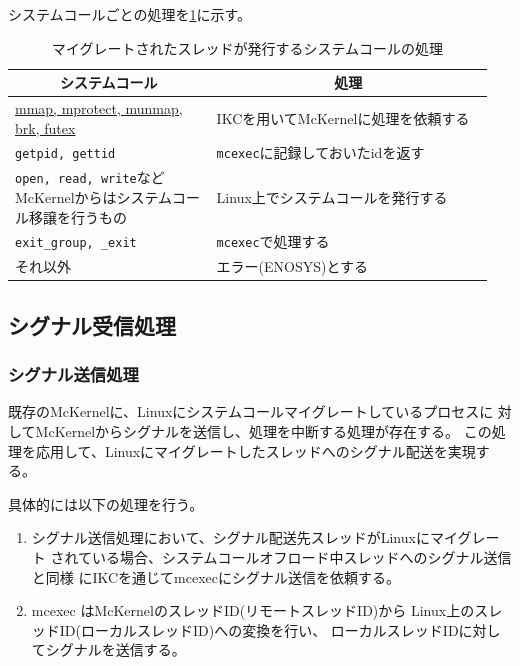 \documentclass[twoside,11pt,fleqn]{book}
\newcommand\textttw[1]{\mathchardef\UrlBreakPenalty=100\mathchardef\UrlBigBreakPenalty=100\url{#1}}
\begin{document}
システムコールごとの処理を\ref{tab:roffload}に示す。
\begin{table}[!h]
\footnotesize
\caption{マイグレートされたスレッドが発行するシステムコールの処理}\vspace{0.0em}
\label{tab:roffload}
\begin{tabular}{|p{0.40\linewidth}|p{0.55\linewidth}|} \hline
\multicolumn{1}{|c}{\textbf{システムコール}}&\multicolumn{1}{|c|}{\textbf{処理}}\\ \hline \hline
\textttw{mmap, mprotect, munmap, brk, futex}&IKCを用いてMcKernelに処理を依頼する \\ \hline
\texttt{getpid, gettid}&\texttt{mcexec}に記録しておいたidを返す\\ \hline
\texttt{open, read, write}などMcKernelからはシステムコール移譲を行うもの&Linux上でシステムコールを発行する\\ \hline
\texttt{exit\_group, \_exit}&\texttt{mcexec}で処理する\\ \hline
それ以外&エラー(ENOSYS)とする\\ \hline
\end{tabular}
\vspace{-0em}
\end{table}
\FloatBarrier

\subsection{シグナル受信処理}

\subsubsection{シグナル送信処理}

既存のMcKernelに、Linuxにシステムコールマイグレートしているプロセスに
対してMcKernelからシグナルを送信し、処理を中断する処理が存在する。
この処理を応用して、Linuxにマイグレートしたスレッドへのシグナル配送を実現する。

具体的には以下の処理を行う。
\begin{enumerate}
\item シグナル送信処理において、シグナル配送先スレッドがLinuxにマイグレート
されている場合、システムコールオフロード中スレッドへのシグナル送信と同様
にIKCを通じてmcexecにシグナル送信を依頼する。
\item mcexec はMcKernelのスレッドID(リモートスレッドID)から
Linux上のスレッドID(ローカルスレッドID)への変換を行い、
ローカルスレッドIDに対してシグナルを送信する。
\end{enumerate}
\end{document}

